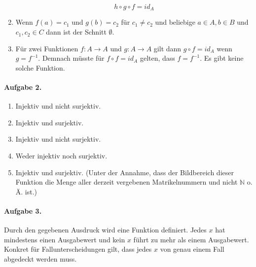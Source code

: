 \documentclass{article}
\begin{document}
\begin{enumerate}[label=\alph*)]
    \begin{equation*}
        h \circ g \circ f = id_A
    \end{equation*}
    
    \item Wenn $f(a) = c_1$ und $g(b) = c_2$ für $c_1 \neq c_2$ und beliebige $a \in A, b \in B$ und $c_1, c_2 \in C$ dann ist der Schnitt $\emptyset$.
    
    \item Für zwei Funktionen $f : A \rightarrow A$ und $g : A \rightarrow A$ gilt dann $g \circ f = id_A$ wenn $g = f^{-1}$. Demnach müsste für $f \circ f = id_A$ gelten, dass $f = f^{-1}$. Es gibt keine solche Funktion.

\end{enumerate}

\paragraph{Aufgabe 2.}

\begin{enumerate}[label=\alph*)]
    \item Injektiv und nicht surjektiv.
    \item Injektiv und surjektiv.
    \item Injektiv und nicht surjektiv.
    \item Weder injektiv noch surjektiv.
    \item Injektiv und surjektiv. (Unter der Annahme, dass der Bildbereich dieser Funktion die Menge aller derzeit vergebenen Matrikelnummern und nicht $\mathbb{N}$ o. Ä. ist.)
\end{enumerate}

\paragraph{Aufgabe 3.}

Durch den gegebenen Ausdruck wird eine Funktion definiert. Jedes $x$ hat mindestens einen Ausgabewert und kein $x$ führt zu mehr als einem Ausgabewert. Konkret für Fallunterscheidungen gilt, dass jedes $x$ von genau einem Fall abgedeckt werden muss.
\end{document}
